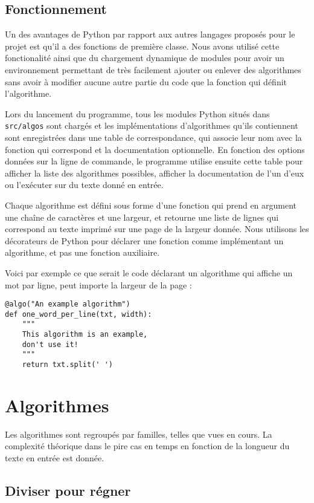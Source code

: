 \documentclass{article}
\begin{document}
\section{Fonctionnement}

Un des avantages de Python par rapport aux autres langages proposés pour le
projet est qu'il a des fonctions de première classe. Nous avons utilisé cette
fonctionalité ainsi que du chargement dynamique de modules pour avoir un
environnement permettant de très facilement ajouter ou enlever des algorithmes
sans avoir à modifier aucune autre partie du code que la fonction qui définit
l'algorithme.

Lors du lancement du programme, tous les modules Python situés dans
\verb|src/algos| sont chargés et les implémentations d'algorithmes qu'ils
contiennent sont enregistrées dans une table de correspondance, qui associe leur
nom avec la fonction qui correspond et la documentation optionnelle. En fonction
des options données sur la ligne de commande, le programme utilise ensuite cette
table pour afficher la liste des algorithmes possibles, afficher la
documentation de l'un d'eux ou l'exécuter sur du texte donné en entrée.

Chaque algorithme est défini sous forme d'une fonction qui prend en argument une
chaîne de caractères et une largeur, et retourne une liste de lignes qui
correspond au texte imprimé sur une page de la largeur donnée. Nous utilisons
les décorateurs de Python pour déclarer une fonction comme implémentant un
algorithme, et pas une fonction auxiliaire.

Voici par exemple ce que serait le code déclarant un algorithme qui affiche un
mot par ligne, peut importe la largeur de la page :

\begin{verbatim}
@algo("An example algorithm")
def one_word_per_line(txt, width):
    """
    This algorithm is an example,
    don't use it!
    """
    return txt.split(' ')
\end{verbatim}

\chapter{Algorithmes}

Les algorithmes sont regroupés par familles, telles que vues en cours. La
complexité théorique dans le pire cas en temps en fonction de la longueur du
texte en entrée est donnée.

\section{Diviser pour régner}
\end{document}
